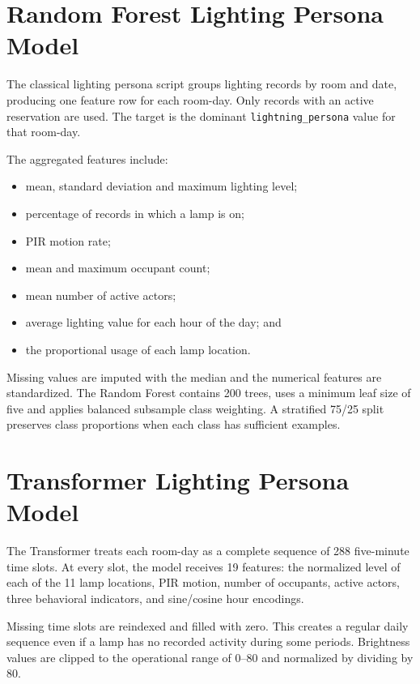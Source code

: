 \section{Random Forest Lighting Persona Model}

The classical lighting persona script groups lighting records by room and
date, producing one feature row for each room-day. Only records with an active
reservation are used. The target is the dominant
\texttt{lightning\_persona} value for that room-day.

The aggregated features include:

\begin{itemize}
    \item mean, standard deviation and maximum lighting level;
    \item percentage of records in which a lamp is on;
    \item PIR motion rate;
    \item mean and maximum occupant count;
    \item mean number of active actors;
    \item average lighting value for each hour of the day; and
    \item the proportional usage of each lamp location.
\end{itemize}

Missing values are imputed with the median and the numerical features are
standardized. The Random Forest contains 200 trees, uses a minimum leaf size of
five and applies balanced subsample class weighting. A stratified 75/25 split
preserves class proportions when each class has sufficient examples.

\section{Transformer Lighting Persona Model}

The Transformer treats each room-day as a complete sequence of 288 five-minute
time slots. At every slot, the model receives 19 features: the normalized level
of each of the 11 lamp locations, PIR motion, number of occupants, active
actors, three behavioral indicators, and sine/cosine hour encodings.

Missing time slots are reindexed and filled with zero. This creates a regular
daily sequence even if a lamp has no recorded activity during some periods.
Brightness values are clipped to the operational range of 0--80 and normalized
by dividing by 80.

